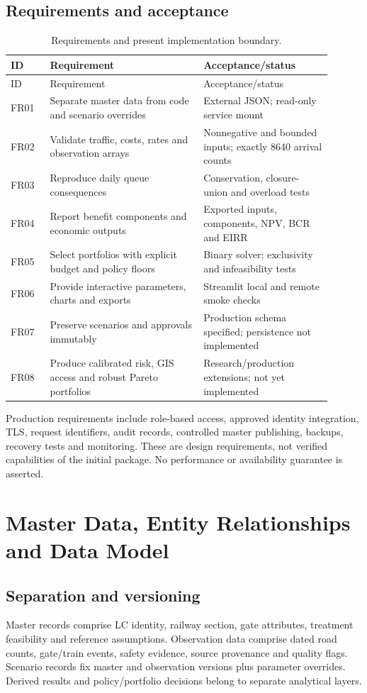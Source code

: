 \documentclass[11pt,a4paper]{article}
\begin{document}
\subsection{Requirements and acceptance}
\begin{longtable}{p{0.11\linewidth}p{0.43\linewidth}p{0.36\linewidth}}
\caption{Requirements and present implementation boundary.}\\\toprule
ID & Requirement & Acceptance/status\\\midrule\endfirsthead
\toprule ID & Requirement & Acceptance/status\\\midrule\endhead
FR01 & Separate master data from code and scenario overrides & External JSON; read-only service mount\\
FR02 & Validate traffic, costs, rates and observation arrays & Nonnegative and bounded inputs; exactly 8640 arrival counts\\
FR03 & Reproduce daily queue consequences & Conservation, closure-union and overload tests\\
FR04 & Report benefit components and economic outputs & Exported inputs, components, NPV, BCR and EIRR\\
FR05 & Select portfolios with explicit budget and policy floors & Binary solver; exclusivity and infeasibility tests\\
FR06 & Provide interactive parameters, charts and exports & Streamlit local and remote smoke checks\\
FR07 & Preserve scenarios and approvals immutably & Production schema specified; persistence not implemented\\
FR08 & Produce calibrated risk, GIS access and robust Pareto portfolios & Research/production extensions; not yet implemented\\\bottomrule
\end{longtable}
Production requirements include role-based access, approved identity integration, TLS, request identifiers, audit records, controlled master publishing, backups, recovery tests and monitoring. These are design requirements, not verified capabilities of the initial package. No performance or availability guarantee is asserted.

\section{Master Data, Entity Relationships and Data Model}
\subsection{Separation and versioning}
Master records comprise LC identity, railway section, gate attributes, treatment feasibility and reference assumptions. Observation data comprise dated road counts, gate/train events, safety evidence, source provenance and quality flags. Scenario records fix master and observation versions plus parameter overrides. Derived results and policy/portfolio decisions belong to separate analytical layers.
\end{document}
